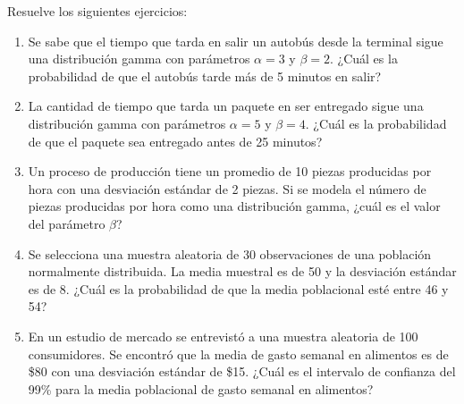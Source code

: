 \begin{Ejer}
Resuelve los siguientes ejercicios:
\begin{enumerate}

    \item Se sabe que el tiempo que tarda en salir un autobús desde la terminal sigue una distribución gamma con parámetros $\alpha=3$ y $\beta=2$. ¿Cuál es la probabilidad de que el autobús tarde más de 5 minutos en salir?
    \item La cantidad de tiempo que tarda un paquete en ser entregado sigue una distribución gamma con parámetros $\alpha=5$ y $\beta=4$. ¿Cuál es la probabilidad de que el paquete sea entregado antes de 25 minutos?
    \item Un proceso de producción tiene un promedio de 10 piezas producidas por hora con una desviación estándar de 2 piezas. Si se modela el número de piezas producidas por hora como una distribución gamma, ¿cuál es el valor del parámetro $\beta$?  
    \item Se selecciona una muestra aleatoria de 30 observaciones de una población normalmente distribuida. La media muestral es de 50 y la desviación estándar es de 8. ¿Cuál es la probabilidad de que la media poblacional esté entre 46 y 54?
    \item En un estudio de mercado se entrevistó a una muestra aleatoria de 100 consumidores. Se encontró que la media de gasto semanal en alimentos es de \$80 con una desviación estándar de \$15. ¿Cuál es el intervalo de confianza del 99\% para la media poblacional de gasto semanal en alimentos?
 

\end{enumerate}
\end{Ejer}
